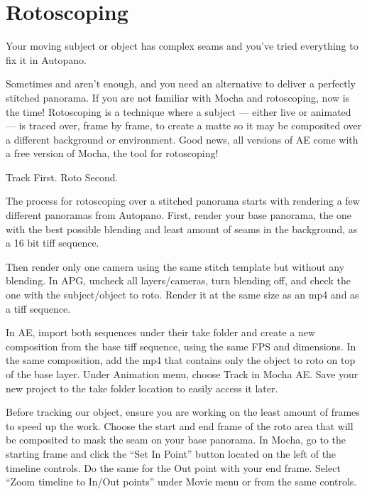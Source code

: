 \section{Rotoscoping}
\pagecolor{white}
\label{chap:50}
\begin{fullwidth}

\problem

{\large Your moving subject or object has complex seams and you’ve tried everything to fix it in Autopano. \par}

Sometimes \textbf{} and \textbf{} aren’t enough, and you need an alternative to deliver a perfectly stitched panorama. If you are not familiar with Mocha and rotoscoping, now is the time! Rotoscoping is a technique where a subject — either live or animated — is traced over, frame by frame, to create a matte so it may be composited over a different background or environment. Good news, all versions of AE come with a free version of Mocha, the tool for rotoscoping! 

\clearpage
\solution

{\large Track First. Roto Second. \par}

The process for rotoscoping over a stitched panorama starts with rendering a few different panoramas from Autopano. First, render your base panorama, the one with the best possible blending and least amount of seams in the background, as a 16 bit tiff sequence. 


Then render only one camera using the same stitch template but without any blending. In APG, uncheck all layers/cameras, turn blending off, and check the one with the subject/object to roto. Render it at the same size as an mp4 and as a tiff sequence.


In AE, import both sequences under their take folder and create a new composition from the base tiff sequence, using the same FPS and dimensions. In the same composition, add the mp4 that contains only the object to roto on top of the base layer. Under Animation menu, choose Track in Mocha AE. Save your new project to the take folder location to easily access it later. 


Before tracking our object, ensure you are working on the least amount of frames to speed up the work. Choose the start and end frame of the roto area that will be composited to mask the seam on your base panorama. In Mocha, go to the starting frame and click the “Set In Point” button located on the left of the timeline controls. Do the same for the Out point with your end frame. Select “Zoom timeline to In/Out points” under Movie menu or from the same controls.


\end{fullwidth}

